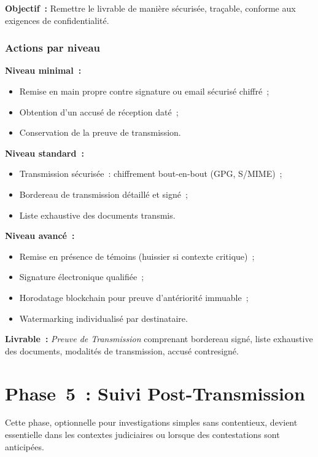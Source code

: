 \textbf{Objectif~:} Remettre le livrable de manière sécurisée, traçable,
conforme aux exigences de confidentialité.

\subsubsection*{Actions par niveau}

\textbf{Niveau minimal~:}
\begin{itemize}
    \item Remise en main propre contre signature ou email sécurisé chiffré~;
    \item Obtention d'un accusé de réception daté~;
    \item Conservation de la preuve de transmission.
\end{itemize}

\textbf{Niveau standard~:}
\begin{itemize}
    \item Transmission sécurisée~: chiffrement bout-en-bout (GPG, S/MIME)~;
    \item Bordereau de transmission détaillé et signé~;
    \item Liste exhaustive des documents transmis.
\end{itemize}

\textbf{Niveau avancé~:}
\begin{itemize}
    \item Remise en présence de témoins (huissier si contexte critique)~;
    \item Signature électronique qualifiée~;
    \item Horodatage blockchain pour preuve d'antériorité immuable~;
    \item Watermarking individualisé par destinataire.
\end{itemize}

\textbf{Livrable~:} \textit{Preuve de Transmission} comprenant bordereau signé,
liste exhaustive des documents, modalités de transmission, accusé contresigné.

\section{Phase~5~: Suivi Post-Transmission}
\label{sec:piu-phase5}

Cette phase, optionnelle pour investigations simples sans contentieux, devient
essentielle dans les contextes judiciaires ou lorsque des contestations sont
anticipées.

